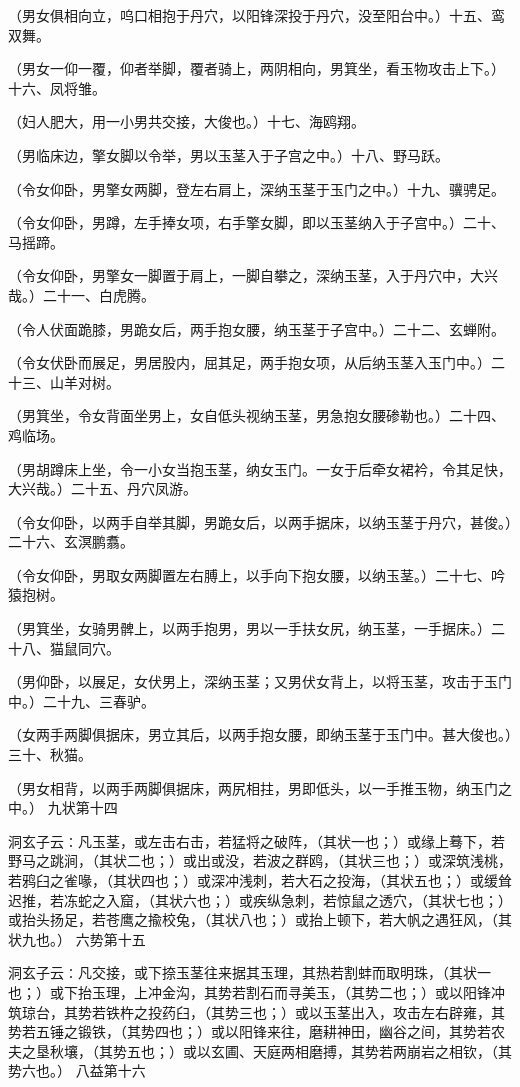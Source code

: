 \documentclass[a4paper,12pt,UTF8,twoside]{ctexbook}
\begin{document}
（男女俱相向立，呜口相抱于丹穴，以阳锋深投于丹穴，没至阳台中。）十五、鸾双舞。

（男女一仰一覆，仰者举脚，覆者骑上，两阴相向，男箕坐，看玉物攻击上下。）十六、凤将雏。

（妇人肥大，用一小男共交接，大俊也。）十七、海鸥翔。

（男临床边，擎女脚以令举，男以玉茎入于子宫之中。）十八、野马跃。

（令女仰卧，男擎女两脚，登左右肩上，深纳玉茎于玉门之中。）十九、骥骋足。

（令女仰卧，男蹲，左手捧女项，右手擎女脚，即以玉茎纳入于子宫中。）二十、马摇蹄。

（令女仰卧，男擎女一脚置于肩上，一脚自攀之，深纳玉茎，入于丹穴中，大兴哉。）二十一、白虎腾。

（令人伏面跪膝，男跪女后，两手抱女腰，纳玉茎于子宫中。）二十二、玄蝉附。

（令女伏卧而展足，男居股内，屈其足，两手抱女项，从后纳玉茎入玉门中。）二十三、山羊对树。

（男箕坐，令女背面坐男上，女自低头视纳玉茎，男急抱女腰碜勒也。）二十四、鸡临场。

（男胡蹲床上坐，令一小女当抱玉茎，纳女玉门。一女于后牵女裙衿，令其足快，大兴哉。）二十五、丹穴凤游。

（令女仰卧，以两手自举其脚，男跪女后，以两手据床，以纳玉茎于丹穴，甚俊。）二十六、玄溟鹏翥。

（令女仰卧，男取女两脚置左右膊上，以手向下抱女腰，以纳玉茎。）二十七、吟猿抱树。

（男箕坐，女骑男髀上，以两手抱男，男以一手扶女尻，纳玉茎，一手据床。）二十八、猫鼠同穴。

（男仰卧，以展足，女伏男上，深纳玉茎；又男伏女背上，以将玉茎，攻击于玉门中。）二十九、三春驴。

（女两手两脚俱据床，男立其后，以两手抱女腰，即纳玉茎于玉门中。甚大俊也。）三十、秋猫。

（男女相背，以两手两脚俱据床，两尻相拄，男即低头，以一手推玉物，纳玉门之中。）
九状第十四

洞玄子云∶凡玉茎，或左击右击，若猛将之破阵，（其状一也；）或缘上蓦下，若野马之跳涧，（其状二也；）或出或没，若波之群鸥，（其状三也；）或深筑浅桃，若鸦臼之雀喙，（其状四也；）或深冲浅刺，若大石之投海，（其状五也；）或缓耸迟推，若冻蛇之入窟，（其状六也；）或疾纵急刺，若惊鼠之透穴，（其状七也；）或抬头扬足，若苍鹰之揄校兔，（其状八也；）或抬上顿下，若大帆之遇狂风，（其状九也。）
六势第十五

洞玄子云∶凡交接，或下捺玉茎往来据其玉理，其热若割蚌而取明珠，（其状一也；）或下抬玉理，上冲金沟，其势若割石而寻美玉，（其势二也；）或以阳锋冲筑琼台，其势若铁杵之投药臼，（其势三也；）或以玉茎出入，攻击左右辟雍，其势若五锤之锻铁，（其势四也；）或以阳锋来往，磨耕神田，幽谷之间，其势若农夫之垦秋壤，（其势五也；）或以玄圃、天庭两相磨搏，其势若两崩岩之相钦，（其势六也。）
八益第十六
\end{document}
